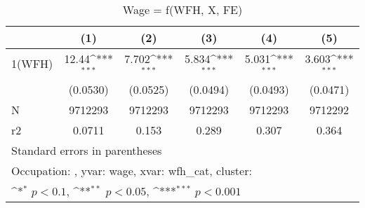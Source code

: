 \begin{table}[htbp]\centering
\def\sym#1{\ifmmode^{#1}\else\(^{#1}\)\fi}
\caption{Wage = f(WFH, X, FE)}
\begin{tabular}{l*{5}{c}}
\hline\hline
                    &\multicolumn{1}{c}{(1)}         &\multicolumn{1}{c}{(2)}         &\multicolumn{1}{c}{(3)}         &\multicolumn{1}{c}{(4)}         &\multicolumn{1}{c}{(5)}         \\
\hline
1(WFH)              &       12.44\sym{***}&       7.702\sym{***}&       5.834\sym{***}&       5.031\sym{***}&       3.603\sym{***}\\
                    &    (0.0530)         &    (0.0525)         &    (0.0494)         &    (0.0493)         &    (0.0471)         \\
\hline
N                   &     9712293         &     9712293         &     9712293         &     9712293         &     9712292         \\
r2                  &      0.0711         &       0.153         &       0.289         &       0.307         &       0.364         \\
\hline\hline
\multicolumn{6}{l}{\footnotesize Standard errors in parentheses}\\
\multicolumn{6}{l}{\footnotesize Occupation: , yvar: wage, xvar: wfh\_cat, cluster: }\\
\multicolumn{6}{l}{\footnotesize \sym{*} \(p<0.1\), \sym{**} \(p<0.05\), \sym{***} \(p<0.001\)}\\
\end{tabular}
\end{table}
